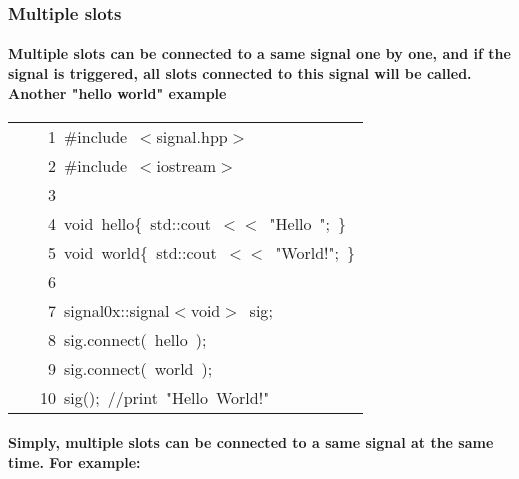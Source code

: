 \documentclass[9pt,onside,a4paper]{article}
\newcommand{\hlstd}[1]{\textcolor[rgb]{0.2,0,0.4}{#1}}
\newcommand{\hlstr}[1]{\textcolor[rgb]{0.09,0.38,0.65}{#1}}
\newcommand{\hlslc}[1]{\textcolor[rgb]{0,0.4,0.2}{#1}}
\newcommand{\hlppc}[1]{\textcolor[rgb]{0.33,0.45,0.69}{#1}}
\newcommand{\hlopt}[1]{\textcolor[rgb]{0.33,0.33,0.33}{#1}}
\newcommand{\hllin}[1]{\textcolor[rgb]{0.6,0.6,0.6}{#1}}
\newcommand{\hlkwb}[1]{\textcolor[rgb]{0.96,0.55,0.14}{#1}}
\newcommand{\hlkwd}[1]{\textcolor[rgb]{0.82,0.11,0.93}{#1}}
\begin{document}
\subsubsection{Multiple slots}

\paragraph{Multiple slots can be connected to a same signal one by one, and if the signal is triggered, all slots connected to this signal will be called. 
Another "hello world" example  }

\ttfamily
\begin{center}
\begin{xtabular}{||l||}
\hline
\hlstd{}\hllin{\ \ \ \ 1\ }\hlppc{\#include\ $<$signal.hpp$>$}\\
\hllin{\ \ \ \ 2\ }\hlstd{}\hlppc{\#include\ $<$iostream$>$}\\
\hllin{\ \ \ \ 3\ }\hlstd{}\\
\hllin{\ \ \ \ 4\ }\hlkwb{void\ }\hlstd{hello}\hlopt{\{\ }\hlstd{std}\hlopt{::}\hlstd{cout\ }\hlopt{$<$$<$\ }\hlstd{}\hlstr{"Hello\ "}\hlstd{}\hlopt{;\ \}}\\
\hllin{\ \ \ \ 5\ }\hlstd{}\hlkwb{void\ }\hlstd{world}\hlopt{\{\ }\hlstd{std}\hlopt{::}\hlstd{cout\ }\hlopt{$<$$<$\ }\hlstd{}\hlstr{"World!"}\hlstd{}\hlopt{;\ \}}\\
\hllin{\ \ \ \ 6\ }\hlstd{}\\
\hllin{\ \ \ \ 7\ }\hlstd{signal0x}\hlopt{::}\hlstd{signal}\hlopt{$<$}\hlstd{}\hlkwb{void}\hlstd{}\hlopt{$>$\ }\hlstd{sig}\hlopt{;}\\
\hllin{\ \ \ \ 8\ }\hlstd{sig}\hlopt{.}\hlstd{}\hlkwd{connect}\hlstd{}\hlopt{(\ }\hlstd{hello\ }\hlopt{);}\\
\hllin{\ \ \ \ 9\ }\hlstd{sig}\hlopt{.}\hlstd{}\hlkwd{connect}\hlstd{}\hlopt{(\ }\hlstd{world\ }\hlopt{);}\\
\hllin{\ \ \ 10\ }\hlstd{}\hlkwd{sig}\hlstd{}\hlopt{();\ }\hlstd{}\hlslc{//print\ "Hello\ World!"}\hlstd{}\\
\hline
\end{xtabular}
\end{center}
\normalfont
\normalsize

\paragraph{Simply, multiple slots can be connected to a same signal at the same time. For example: }
\end{document}
